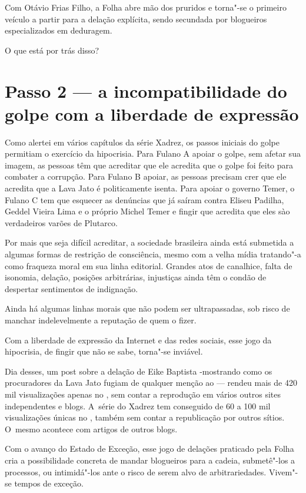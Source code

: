Com Otávio Frias Filho, a Folha abre mão dos pruridos e torna"-se o
primeiro veículo a partir para a delação explícita, sendo secundada por
blogueiros especializados em deduragem.

O que está por trás disso?

\section{Passo 2 --- a incompatibilidade do golpe com a liberdade de
expressão}

Como alertei em vários capítulos da série Xadrez, os passos iniciais do
golpe permitiam o exercício da hipocrisia. Para Fulano A apoiar o golpe,
sem afetar sua imagem, as pessoas têm que acreditar que ele acredita que
o golpe foi feito para combater a corrupção. Para Fulano B apoiar, as
pessoas precisam crer que ele acredita que a Lava Jato é politicamente
isenta. Para apoiar o governo Temer, o Fulano C tem que esquecer as
denúncias que já saíram contra Eliseu Padilha, Geddel Vieira Lima e o
próprio Michel Temer e fingir que acredita que eles sào verdadeiros
varões de Plutarco.

Por mais que seja difícil acreditar, a sociedade brasileira ainda está
submetida a algumas formas de restrição de consciência, mesmo com a
velha mídia tratando"-a como fraqueza moral em sua linha editorial.
Grandes atos de canalhice, falta de isonomia, delação, posições
arbitrárias, injustiças ainda têm o condão de despertar sentimentos de
indignação.

Ainda há algumas linhas morais que não podem ser ultrapassadas, sob
risco de manchar indelevelmente a reputação de quem o fizer.

Com a liberdade de expressão da Internet e das redes sociais, esse jogo
da hipocrisia, de fingir que não se sabe, torna"-se inviável.

Dia desses, um post sobre a delação de Eike Baptista -mostrando como os
procuradores da Lava Jato fugiam de qualquer menção ao  --- rendeu
mais de 420 mil visualizações apenas no , sem contar a reprodução em
vários outros sites independentes e blogs. A~série do Xadrez tem
conseguido de 60 a 100 mil visualizações únicas no , também sem
contar a republicação por outros sítios. O~mesmo acontece com artigos de
outros blogs.

Com o avanço do Estado de Exceção, esse jogo de delações praticado pela
Folha cria a possibilidade concreta de mandar blogueiros para a cadeia,
submetê"-los a processos, ou intimidá"-los ante o risco de serem alvo de
arbitrariedades. Vivem"-se tempos de exceção.

